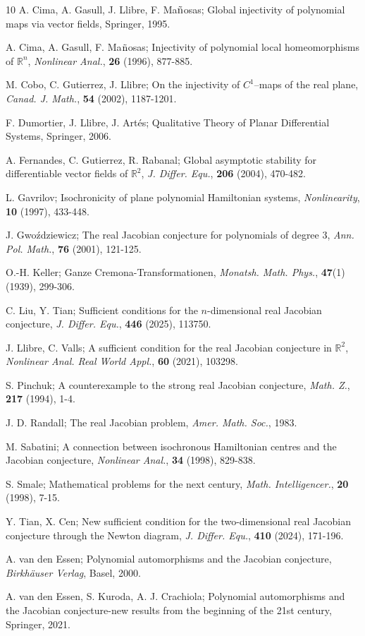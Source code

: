 \documentclass[reqno]{amsart}
\begin{document}
\begin{thebibliography}{10}
A. Cima, A. Gasull, J. Llibre, F. Ma$\Tilde{\rm n}$osas;
Global injectivity of polynomial maps via vector fields, Springer, 1995.

A. Cima, A. Gasull, F. Ma$\Tilde{\rm n}$osas;
Injectivity of polynomial local homeomorphisms of $\mathbb{R}^n$,
\emph{Nonlinear Anal.}, \textbf{26} (1996), 877-885.

M. Cobo, C. Gutierrez, J. Llibre;
On the injectivity of $C^1$–maps of the real plane,
\emph{Canad. J. Math.}, \textbf{54} (2002), 1187-1201.

F. Dumortier, J. Llibre, J. Art\'{e}s;
Qualitative Theory of Planar Differential Systems, Springer, 2006.

A. Fernandes, C. Gutierrez, R. Rabanal;
Global asymptotic stability for differentiable vector fields of $\mathbb{R}^2$,
\emph{J. Differ. Equ.}, \textbf{206} (2004), 470-482.

L. Gavrilov;
Isochronicity of plane polynomial Hamiltonian systems,
\emph{Nonlinearity}, \textbf{10} (1997), 433-448.

J. Gwo\'{z}dziewicz;
The real Jacobian conjecture for polynomials of degree 3,
\emph{Ann. Pol. Math.}, \textbf{76} (2001), 121-125.

O.-H. Keller;
Ganze Cremona-Transformationen,
\emph{Monatsh. Math. Phys.}, \textbf{47}(1) (1939), 299-306.

C. Liu, Y. Tian;
Sufficient conditions for the $n$-dimensional real Jacobian conjecture,
\emph{J. Differ. Equ.}, \textbf{446} (2025), 113750.

J. Llibre, C. Valls;
A sufficient condition for the real Jacobian conjecture in $\mathbb{R}^2$,
\emph{Nonlinear Anal. Real World Appl.}, \textbf{60} (2021), 103298.

S. Pinchuk;
A counterexample to the strong real Jacobian conjecture,
\emph{Math. Z.}, \textbf{217} (1994), 1-4.

J. D. Randall;
The real Jacobian problem,
\emph{Amer. Math. Soc.}, 1983.

M. Sabatini;
A connection between isochronous Hamiltonian centres and the Jacobian conjecture,
\emph{Nonlinear Anal.}, \textbf{34} (1998), 829-838.

S. Smale;
Mathematical problems for the next century,
\emph{Math. Intelligencer.}, \textbf{20} (1998), 7-15.

Y. Tian, X. Cen;
New sufficient condition for the two-dimensional real Jacobian conjecture 
through the Newton diagram,
\emph{J. Differ. Equ.}, \textbf{410} (2024), 171-196.

A. van den Essen;
Polynomial automorphisms and the Jacobian conjecture,
\emph{Birkh\"{a}user Verlag}, Basel, 2000.

A. van den Essen, S. Kuroda, A. J. Crachiola;
Polynomial automorphisms and the Jacobian conjecture-new results from the beginning 
of the 21st century, Springer, 2021.

\end{thebibliography}
\end{document}
